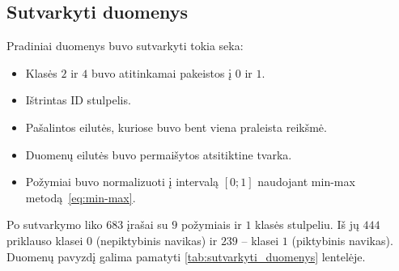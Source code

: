 \subsection{Sutvarkyti duomenys}
\label{subsec:sutvarkyti_duomenys}

Pradiniai duomenys buvo sutvarkyti tokia seka:
\begin{itemize}
    \item Klasės $2$ ir $4$ buvo atitinkamai pakeistos į $0$ ir $1$.
    \item Ištrintas ID stulpelis.
    \item Pašalintos eilutės, kuriose buvo bent viena praleista reikšmė.
    \item Duomenų eilutės buvo permaišytos atsitiktine tvarka.
    \item Požymiai buvo normalizuoti į intervalą $[0; 1]$ naudojant min-max metodą~\eqref{eq:min-max}.
\end{itemize}

Po sutvarkymo liko $683$ įrašai su $9$ požymiais ir $1$ klasės stulpeliu. Iš jų $444$ priklauso klasei $0$ (nepiktybinis navikas) ir $239$ – klasei $1$ (piktybinis navikas). Duomenų pavyzdį galima pamatyti \ref{tab:sutvarkyti_duomenys} lentelėje.

